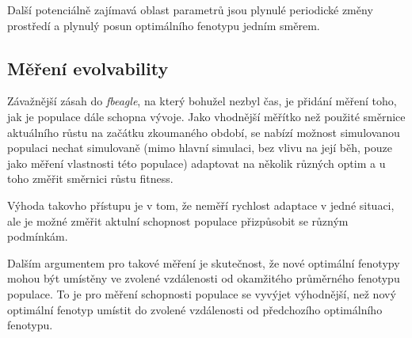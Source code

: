 Další potenciálně zajímavá oblast parametrů jsou plynulé periodické změny prostředí a plynulý posun optimálního fenotypu jedním směrem.

\subsection{Měření evolvability}

Závažnější zásah do \textit{fbeagle}, na který bohužel nezbyl čas, je přidání měření toho, jak je populace dále schopna vývoje.
Jako vhodnější měřítko než použité směrnice aktuálního růstu na začátku zkoumaného období, se nabízí možnost simulovanou populaci
nechat simulovaně (mimo hlavní simulaci, bez vlivu na její běh, pouze jako měření vlastnosti této populace) adaptovat na
několik různých optim a u toho změřit směrnici růstu fitness.

Výhoda takovho přístupu je v tom, že neměří rychlost adaptace v jedné situaci, ale je možné změřit aktulní schopnost populace přizpůsobit
se různým podmínkám.

Dalším argumentem pro takové měření je skutečnost, že nové optimální fenotypy mohou být umístěny ve zvolené vzdálenosti od okamžitého
průměrného fenotypu populace. To je pro měření schopnosti populace se vyvýjet výhodnější, než nový optimální fenotyp umístit do 
zvolené vzdálenosti od předchozího optimálního fenotypu.
